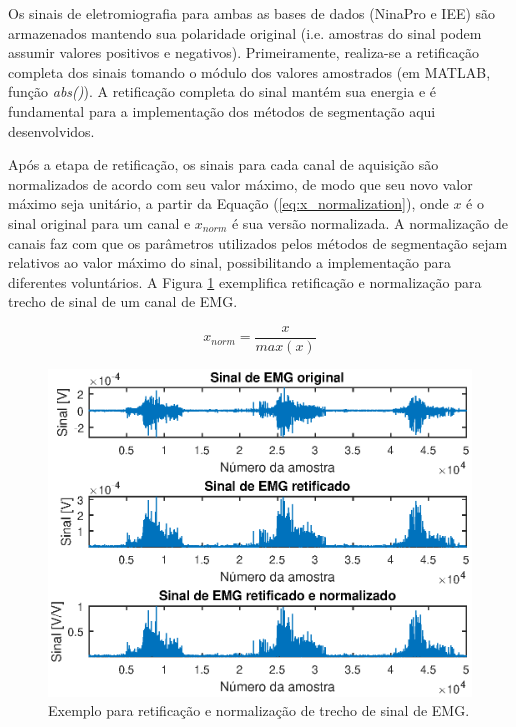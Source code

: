 Os sinais de eletromiografia para ambas as bases de dados (NinaPro e IEE) são armazenados mantendo sua polaridade original (i.e. amostras do sinal podem assumir valores positivos e negativos). Primeiramente, realiza-se a retificação completa dos sinais tomando o módulo dos valores amostrados (em MATLAB, função \emph{abs()}). A retificação completa do sinal mantém sua energia e é fundamental para a implementação dos métodos de segmentação aqui desenvolvidos.

Após a etapa de retificação, os sinais para cada canal de aquisição são normalizados de acordo com seu valor máximo, de modo que seu novo valor máximo seja unitário, a partir da Equação (\ref{eq:x_normalization}), onde $x$ é o sinal original para um canal e $x_{norm}$ é sua versão normalizada. A normalização de canais faz com que os parâmetros utilizados pelos métodos de segmentação sejam relativos ao valor máximo do sinal, possibilitando a implementação para diferentes voluntários. A Figura \ref{fig:normalization} exemplifica retificação e normalização para trecho de sinal de um canal de EMG.

\begin{equation}
	\label{eq:x_normalization}
	x_{norm} = \frac{x}{max(x)}
\end{equation}

\begin{figure}[htb]
	\caption{\label{fig:normalization}Exemplo para retificação e normalização de trecho de sinal de EMG.}
	\begin{center}
	    \includegraphics[width=0.75\linewidth]{./img/matlab/prettyRaw.eps}
	\end{center}
\end{figure}

